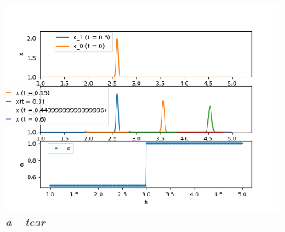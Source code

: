 \documentclass{article}
\begin{document}
\begin{figure}[h]
\begin{subfigure}{0.33\textwidth}
    {\includegraphics[width=1\linewidth]{tests_bcomp/a_tear_x0_gauss.png} \\$a - tear$}
    \end{subfigure}
\end{figure}
\end{document}
